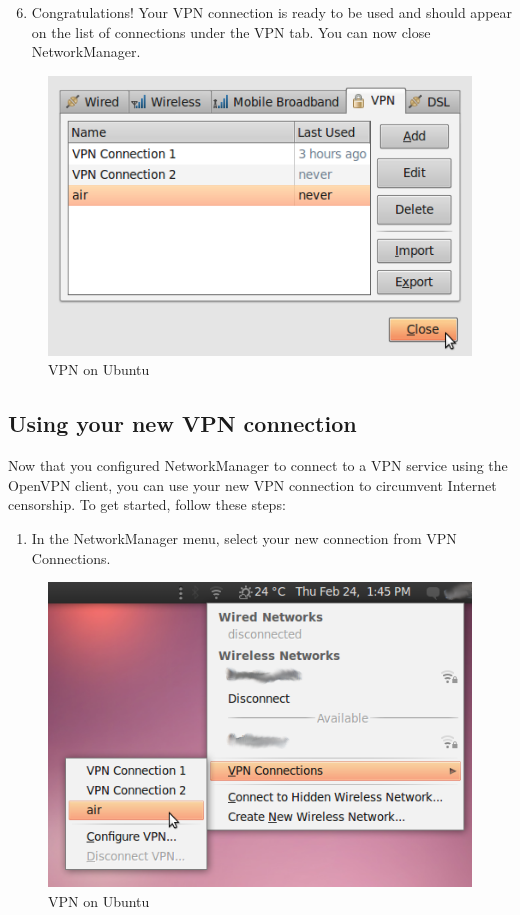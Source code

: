 \begin{enumerate}[1.]
\setcounter{enumi}{5}
\item
  Congratulations! Your VPN connection is ready to be used and should
  appear on the list of connections under the VPN tab. You can now close
  NetworkManager.
\end{enumerate}
\begin{figure}[htbp]
\centering
\includegraphics{vpn_ubuntu_013.png}
\caption{VPN on Ubuntu}
\end{figure}

\subsection{Using your new VPN connection}

Now that you configured NetworkManager to connect to a VPN service using
the OpenVPN client, you can use your new VPN connection to circumvent
Internet censorship. To get started, follow these steps:

\begin{enumerate}[1.]
\item
  In the NetworkManager menu, select your new connection from VPN
  Connections.
\end{enumerate}
\begin{figure}[htbp]
\centering
\includegraphics{vpn_ubuntu_014.png}
\caption{VPN on Ubuntu}
\end{figure}


